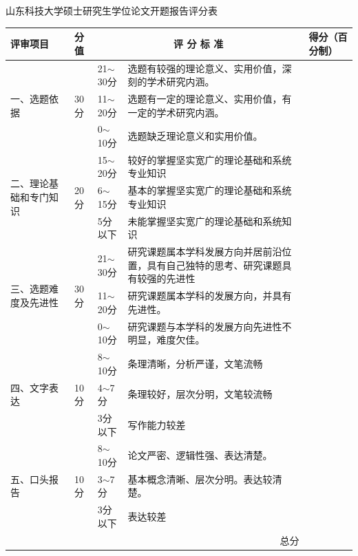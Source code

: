 \documentclass[a4paper,12pt]{ctexart}
\begin{document}
\begin{center}
  {\heiti 山东科技大学硕士研究生学位论文开题报告评分表}
  \vspace{8pt}

  \begin{tabular}{|p{2.6cm}|p{1.4cm}|p{2.0cm}|p{6.2cm}|p{1.6cm}|}
    \hline
    评审项目 & 分值 & \multicolumn{2}{|c|}{评 分 标 准} & 得分（百分制） \\
    \hline
    \multirow{3}{*}{一、选题依据} & \multirow{3}{*}{30分} & 21$\sim$30分 & 选题有较强的理论意义、实用价值，深刻的学术研究内涵。 & \\
    \cline{3-5}
    & & 11$\sim$20分 & 选题有一定的理论意义、实用价值，有一定的学术研究内涵。 & \\
    \cline{3-5}
    & & 0$\sim$10分 & 选题缺乏理论意义和实用价值。 & \\
    \hline
    \multirow{3}{*}{二、理论基础和专门知识} & \multirow{3}{*}{20分} & 15$\sim$20分 & 较好的掌握坚实宽广的理论基础和系统专业知识 & \\
    \cline{3-5}
    & & 6$\sim$15分 & 基本的掌握坚实宽广的理论基础和系统专业知识 & \\
    \cline{3-5}
    & & 5分以下 & 未能掌握坚实宽广的理论基础和系统知识 & \\
    \hline
    \multirow{3}{*}{三、选题难度及先进性} & \multirow{3}{*}{30分} & 21$\sim$30分 & 研究课题属本学科发展方向并居前沿位置，具有自己独特的思考、研究课题具有较强的先进性 & \\
    \cline{3-5}
    & & 11$\sim$20分 & 研究课题属本学科的发展方向，并具有先进性。 & \\
    \cline{3-5}
    & & 0$\sim$10分 & 研究课题与本学科的发展方向先进性不明显，难度欠佳。 & \\
    \hline
    \multirow{3}{*}{四、文字表达} & \multirow{3}{*}{10分} & 8$\sim$10分 & 条理清晰，分析严谨，文笔流畅 & \\
    \cline{3-5}
    & & 4$\sim$7分 & 条理较好，层次分明，文笔较流畅 & \\
    \cline{3-5}
    & & 3分以下 & 写作能力较差 & \\
    \hline
    \multirow{3}{*}{五、口头报告} & \multirow{3}{*}{10分} & 8$\sim$10分 & 论文严密、逻辑性强、表达清楚。 & \\
    \cline{3-5}
    & & 3$\sim$7分 & 基本概念清晰、层次分明。表达较清楚。 & \\
    \cline{3-5}
    & & 3分以下 & 表达较差 & \\
    \hline
    \multicolumn{4}{|r|}{总分} & \\
    \hline
  \end{tabular}


\end{center}
\end{document}
